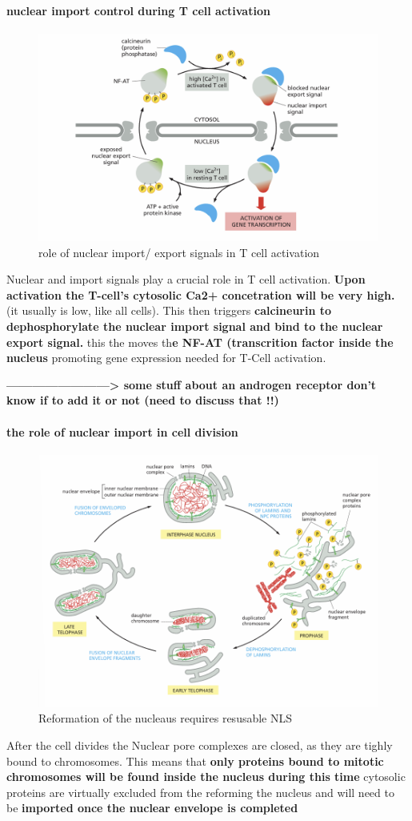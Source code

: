 \documentclass[../main.tex]{subfiles}
\begin{document}
\paragraph{nuclear import control during T cell activation}
\begin{figure}[H]
    \centering
    \includegraphics[width=0.5\linewidth]{TCells.png}
    \caption{role of nuclear import/ export signals in T cell activation}
    \label{fig:enter-label}
\end{figure}

Nuclear and import signals play a crucial role in T cell activation. \textbf{Upon activation the T-cell's cytosolic Ca2+ concetration will be very high.} (it usually is low, like all cells). This then triggers \textbf{\gls{calcineurin} to dephosphorylate the nuclear import signal and bind to the nuclear export signal.} this the moves th\textbf{e NF-AT (transcrition factor inside the nucleus} promoting gene expression needed for T-Cell activation.


\textbf{------------------------> some stuff about an androgen receptor don't know if to add it or not (need to discuss that !!)}

\paragraph{the role of nuclear import in cell division}
\begin{figure}[H]
    \centering
    \includegraphics[width=0.5\linewidth]{Sum_Cell_Bio_II//lectures//cbII4/NuclearReforming.png}
    \caption{Reformation of the nucleaus requires resusable NLS}
    \label{fig:enter-label}
\end{figure}
After the cell divides the Nuclear pore complexes are closed, as they are tighly bound to chromosomes. This means that \textbf{only proteins bound to mitotic chromosomes will be found inside the nucleus during this time} cytosolic proteins are virtually excluded from the reforming the nucleus and will need to be \textbf{imported once the nuclear envelope is completed}
\end{document}
